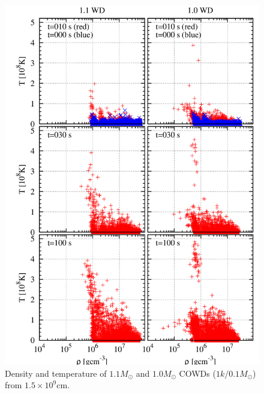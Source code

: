 \documentclass[fleqn,dvipdfmx]{article}
\begin{document}
\begin{figure}
  \begin{center}
    \includegraphics[width=14cm,bb=0 0 880 1240]{fig/bwd.1.5/draw.png}
  \end{center}
  \caption{Density and temperature of $1.1M_\odot$ and $1.0M_\odot$
    COWDs ($1k/0.1M_{\odot}$) from $1.5 \times 10^9$cm.}
\end{figure}
\end{document}
